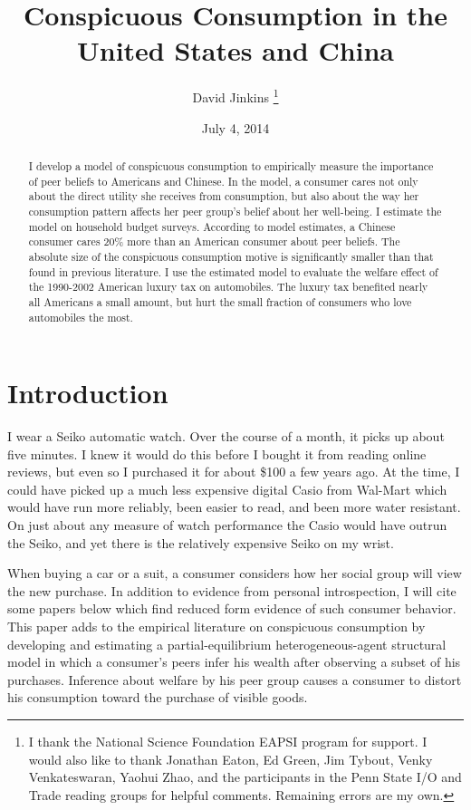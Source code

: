 \documentclass[12pt]{article}
\title{Conspicuous Consumption in the United States and China}
\author{David Jinkins
    \thanks{I thank the National Science Foundation EAPSI program for support.  I would also like to thank Jonathan Eaton, Ed Green, Jim Tybout, Venky Venkateswaran, Yaohui Zhao, and the participants in the Penn State I/O and Trade reading groups for helpful comments. Remaining errors are my own.}
}
\date{July 4, 2014}
\begin{document}
\maketitle

\begin{abstract}
I develop a model of conspicuous consumption to empirically measure the importance of peer beliefs to Americans and Chinese.  In the model, a consumer cares not only about the direct utility she receives from consumption, but also about the way her consumption pattern affects her peer group's belief about her well-being.  I estimate the model on household budget surveys. According to model estimates, a Chinese consumer cares 20\% more than an American consumer about peer beliefs.  The absolute size of the conspicuous consumption motive is significantly smaller than that found in previous literature.  I use the estimated model to evaluate the welfare effect of the 1990-2002 American luxury tax on automobiles.  The luxury tax benefited nearly all Americans a small amount, but hurt the small fraction of consumers who love automobiles the most. \end{abstract}

\section{Introduction}

I wear a Seiko automatic watch.  Over the course of a month, it picks up about five minutes.  I knew it would do this before I bought it from reading online reviews, but even so I purchased it for about \$100 a few years ago.  At the time, I could have picked up a much less expensive digital Casio from Wal-Mart which would have run more reliably, been easier to read, and been more water resistant.  On just about any measure of watch performance the Casio would have outrun the Seiko, and yet there is the relatively expensive Seiko on my wrist.

When buying a car or a suit, a consumer considers how her social group will view the new purchase.  In addition to evidence from personal introspection, I will cite some papers below which find reduced form evidence of such consumer behavior. This paper adds to the empirical literature on conspicuous consumption by developing and estimating a partial-equilibrium heterogeneous-agent structural model in which a consumer's peers infer his wealth after observing a subset of his purchases.  Inference about welfare by his peer group causes a consumer to distort his consumption toward the purchase of visible goods.
\end{document}
